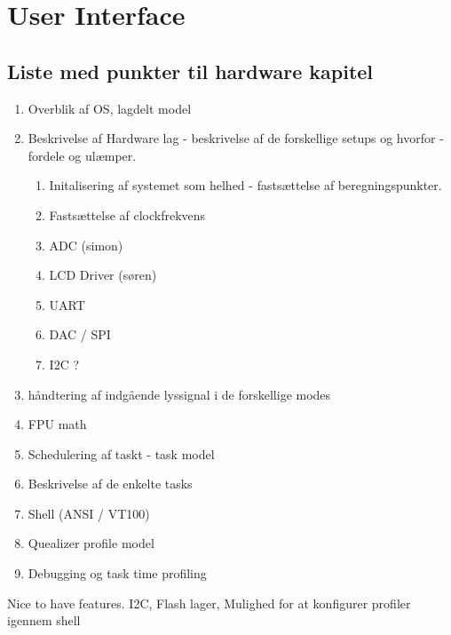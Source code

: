 \chapter{User Interface}\label{kap:hardware}

\section{Liste med punkter til hardware kapitel}

\begin{enumerate}
	\item Overblik af OS, lagdelt model
	\item Beskrivelse af Hardware lag - beskrivelse af de forskellige setups og hvorfor - fordele og ulæmper.
	\begin{enumerate}
		\item Initalisering af systemet som helhed - fastsættelse af beregningspunkter.
		\item Fastsættelse af clockfrekvens
		\item ADC (simon)
		\item LCD Driver (søren)
		\item UART
		\item DAC / SPI
		\item I2C ?
	\end{enumerate}
	\item håndtering af indgående lyssignal i de forskellige modes
	\item FPU math
	\item Schedulering af taskt - task model 
	\item Beskrivelse af de enkelte tasks
	\item Shell (ANSI / VT100)
	\item Quealizer profile model
	\item Debugging og task time profiling
	
\end{enumerate}

Nice to have features.
I2C, Flash lager, Mulighed for at konfigurer profiler igennem shell 
